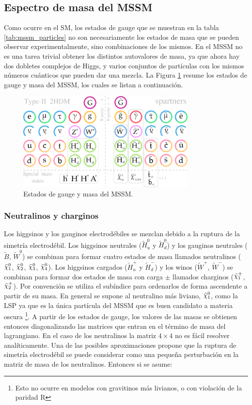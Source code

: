 \subsection{Espectro de masa del MSSM}

Como ocurre en el SM, los estados de gauge que se muestran en la tabla \ref{tab:mssm_particles} no son necesariamente los estados de masa que se pueden observar experimentalmente, sino combinaciones de los mismos. En el MSSM no es una tarea trivial obtener los distintos autovalores de masa, ya que ahora hay dos dobletes complejos de Higgs, y varios conjuntos de partículas con los mismos números cuánticos que pueden dar una mezcla. La Figura \ref{fig:susy_part} resume los estados de gauge y masa del MSSM, los cuales se listan a continuación.

\begin{figure}
  \centering
  \includegraphics[width=0.8\textwidth]{images/sm_susy.pdf}
  \caption{Estados de gauge y masa del MSSM. }
  \label{fig:susy_part}
\end{figure}

\subsubsection{Neutralinos y charginos}

Los higgsinos y los gauginos electrodébiles se mezclan debido a la ruptura de la simetría electrodébil. Los higgsinos neutrales ($\widetilde{H}_u^0$ y $\widetilde{H}_d^0$) y los gauginos neutrales ($\widetilde{B}$, $\widetilde{W}^0$) se combinan para formar cuatro estados de masa llamados neutralinos ($\ninoone$, $\ninotwo$, $\ninothree$, $\ninofour$). Los higgsinos cargados ($\widetilde{H}_u^+$ y $\widetilde{H}_d^-$) y los winos ($\widetilde{W}^+$, $\widetilde{W}^-$) se combinan para formar dos estados de masa con carga $\pm$ llamados charginos ($\chinoonepm$, $\chinotwopm$). Por convención se utiliza el subíndice para ordenarlos de forma ascendente a partir de su masa. En general se supone al neutralino más liviano, $\ninoone$, como la LSP ya que es la única partícula del MSSM que es buen candidato a materia oscura \footnote{Esto no ocurre en modelos con gravitinos más livianos, o con violación de la paridad R}. A partir de los estados de gauge, los valores de las masas se obtienen entonces diagonalizando las matrices que entran en el término de masa del lagrangiano. En el caso de los neutralinos la matriz $4\times4$ no es fácil resolver analíticamente. Una de las posibles aproximaciones propone que la ruptura de simetría electrodébil se puede considerar como una pequeña perturbación en la matriz de masa de los neutralinos. Entonces si se asume: 

